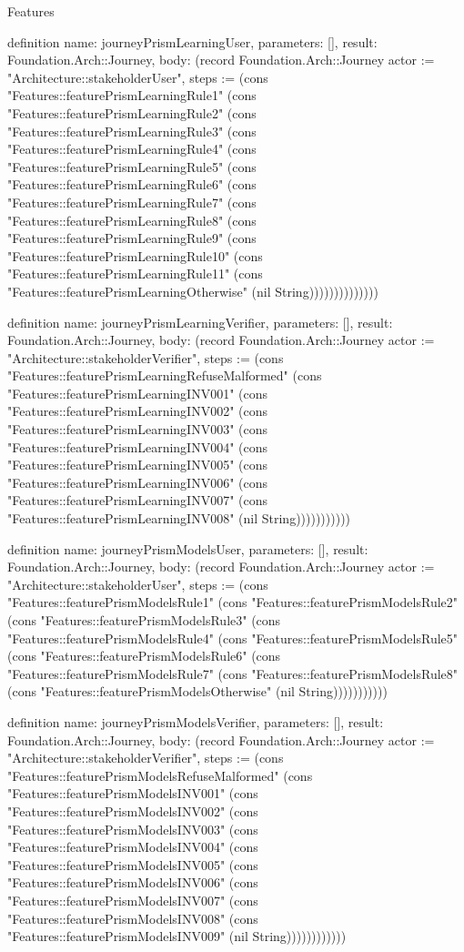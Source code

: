 \begin{lexlean}{Features}
\begin{semanticmodule}
definition{
  name: journeyPrismLearningUser,
  parameters: [],
  result: Foundation.Arch::Journey,
  body: (record Foundation.Arch::Journey {actor := "Architecture::stakeholderUser", steps := (cons "Features::featurePrismLearningRule1" (cons "Features::featurePrismLearningRule2" (cons "Features::featurePrismLearningRule3" (cons "Features::featurePrismLearningRule4" (cons "Features::featurePrismLearningRule5" (cons "Features::featurePrismLearningRule6" (cons "Features::featurePrismLearningRule7" (cons "Features::featurePrismLearningRule8" (cons "Features::featurePrismLearningRule9" (cons "Features::featurePrismLearningRule10" (cons "Features::featurePrismLearningRule11" (cons "Features::featurePrismLearningOtherwise" (nil String)))))))))))))})
}

definition{
  name: journeyPrismLearningVerifier,
  parameters: [],
  result: Foundation.Arch::Journey,
  body: (record Foundation.Arch::Journey {actor := "Architecture::stakeholderVerifier", steps := (cons "Features::featurePrismLearningRefuseMalformed" (cons "Features::featurePrismLearningINV001" (cons "Features::featurePrismLearningINV002" (cons "Features::featurePrismLearningINV003" (cons "Features::featurePrismLearningINV004" (cons "Features::featurePrismLearningINV005" (cons "Features::featurePrismLearningINV006" (cons "Features::featurePrismLearningINV007" (cons "Features::featurePrismLearningINV008" (nil String))))))))))})
}

definition{
  name: journeyPrismModelsUser,
  parameters: [],
  result: Foundation.Arch::Journey,
  body: (record Foundation.Arch::Journey {actor := "Architecture::stakeholderUser", steps := (cons "Features::featurePrismModelsRule1" (cons "Features::featurePrismModelsRule2" (cons "Features::featurePrismModelsRule3" (cons "Features::featurePrismModelsRule4" (cons "Features::featurePrismModelsRule5" (cons "Features::featurePrismModelsRule6" (cons "Features::featurePrismModelsRule7" (cons "Features::featurePrismModelsRule8" (cons "Features::featurePrismModelsOtherwise" (nil String))))))))))})
}

definition{
  name: journeyPrismModelsVerifier,
  parameters: [],
  result: Foundation.Arch::Journey,
  body: (record Foundation.Arch::Journey {actor := "Architecture::stakeholderVerifier", steps := (cons "Features::featurePrismModelsRefuseMalformed" (cons "Features::featurePrismModelsINV001" (cons "Features::featurePrismModelsINV002" (cons "Features::featurePrismModelsINV003" (cons "Features::featurePrismModelsINV004" (cons "Features::featurePrismModelsINV005" (cons "Features::featurePrismModelsINV006" (cons "Features::featurePrismModelsINV007" (cons "Features::featurePrismModelsINV008" (cons "Features::featurePrismModelsINV009" (nil String)))))))))))})
}


\end{semanticmodule}
\end{lexlean}
